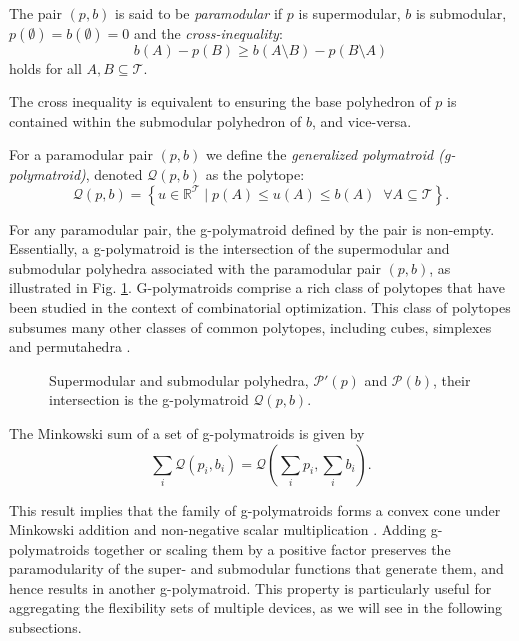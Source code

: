 \begin{definition}
    The pair $(p,b)$ is said to be \emph{paramodular} if $p$ is supermodular, $b$ is submodular, $p(\emptyset) = b(\emptyset) = 0$ and the \emph{cross-inequality}:
    \begin{equation}
        b(A) - p(B) \geq b(A\setminus B) - p(B \setminus A)
    \end{equation} 
    holds for all $A, B \subseteq \mathcal{T}$.
\end{definition}
The cross inequality is equivalent to ensuring the base polyhedron of $p$ is contained within the submodular polyhedron of $b$, and vice-versa.

\begin{definition}\label{dfn:g_polymatroid}
    For a paramodular pair $(p,b)$ we define the \emph{generalized polymatroid (g-polymatroid)}, denoted $\mathcal{Q}(p,b)$ as the polytope:
    \begin{equation}
        \mathcal{Q}(p,b) = \left\{ u \in  \mathbb{R}^{\mathcal{T}} \mid p(A) \leq u(A) \leq b(A) \;\; \forall A \subseteq \mathcal{T} \right\}.
    \end{equation}
\end{definition}
For any paramodular pair, the g-polymatroid defined by the pair is non-empty.
Essentially, a g-polymatroid is the intersection of the supermodular and submodular polyhedra associated with the paramodular pair $(p,b)$, as illustrated in Fig. \ref{fig:sub_super_polyhedra}. G-polymatroids comprise a rich class of polytopes that have been studied in the context of combinatorial optimization. This class of polytopes subsumes many other classes of common polytopes, including cubes, simplexes and permutahedra \cite{Postnikov2009PermutohedraBeyond}. 

\begin{figure}
    \centering
    
    \caption{Supermodular and submodular polyhedra, $ \mathcal{P}'(p)$ and $ \mathcal{P}(b)$, their intersection is the g-polymatroid $\mathcal{Q}(p,b)$.}
    \label{fig:sub_super_polyhedra}
\end{figure}
\begin{theorem}\label{thm:g_polymatroid_sum}\cite[Theorem 14.2.15]{Frank2011ConnectionsOptimization}
    \newline
    The Minkowski sum of a set of g-polymatroids is given by 
    \begin{equation}
        \sum_i \mathcal{Q}(p_i, b_i) = \mathcal{Q}\left(\sum_i p_i, \sum_i b_i\right). 
    \end{equation}
\end{theorem}
\begin{remark}
    This result implies that the family of g-polymatroids forms a convex cone under Minkowski addition and non-negative scalar multiplication \cite{Edmonds2003SubmodularPolyhedra}. Adding g-polymatroids together or scaling them by a positive factor preserves the paramodularity of the super- and submodular functions that generate them, and hence results in another g-polymatroid. This property is particularly useful for aggregating the flexibility sets of multiple devices, as we will see in the following subsections.
\end{remark}

